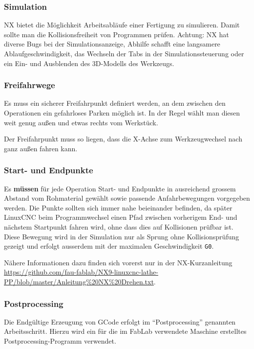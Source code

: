\documentclass{\basedir/fablab-document}
\begin{document}
\subsubsection{Simulation}

NX bietet die Möglichkeit Arbeitsabläufe einer Fertigung zu simulieren. Damit sollte man die Kollisionsfreiheit von Programmen prüfen. Achtung: NX hat diverse Bugs bei der Simulationsanzeige, Abhilfe schafft eine langsamere Ablaufgeschwindigkeit, das Wechseln der Tabs in der Simulationssteuerung oder ein Ein- und Ausblenden des 3D-Modells des Werkzeugs.

\subsubsection{Freifahrwege}
Es muss ein sicherer Freifahrpunkt definiert werden, an dem zwischen den Operationen ein gefahrloses Parken möglich ist. In der Regel wählt man diesen weit genug außen und etwas rechts vom Werkstück.

Der Freifahrpunkt muss so liegen, dass die X-Achse zum Werkzeugwechsel nach ganz außen fahren kann.

\subsubsection{Start- und Endpunkte}

Es \textbf{müssen} für jede Operation Start- und Endpunkte in ausreichend grossem Abstand vom Rohmaterial gewählt sowie passende Anfahrbewegungen vorgegeben werden. Die Punkte sollten sich immer nahe beieinander befinden, da später LinuxCNC beim Programmwechsel einen Pfad zwischen vorherigem End- und nächstem Startpunkt fahren wird, ohne dass dies auf Kollisionen prüfbar ist.
Diese Bewegung wird in der Simulation nur als Sprung ohne Kollisionsprüfung gezeigt und erfolgt ausserdem mit der maximalen Geschwindigkeit \texttt{G0}.

Nähere Informationen dazu finden sich vorerst nur in der NX-Kurzanleitung \url{https://github.com/fau-fablab/NX9-linuxcnc-lathe-PP/blob/master/Anleitung%20NX%20Drehen.txt}.

\subsubsection{Postprocessing}

Die Endgültige Erzeugung von GCode erfolgt im "`Postprocessing"' genannten Arbeitsschritt. Hierzu wird ein für die im FabLab verwendete Maschine erstelltes Postprocessing-Programm verwendet. 
\end{document}

